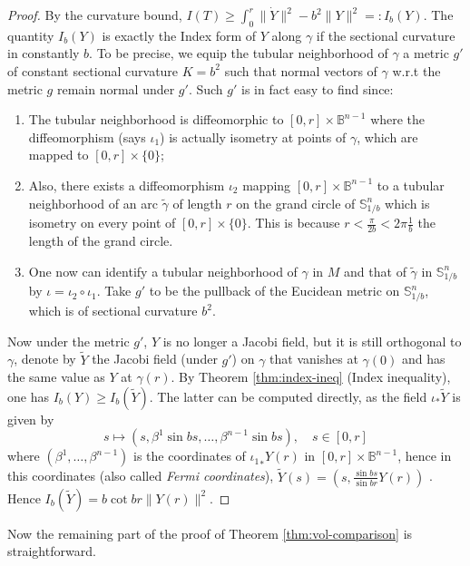 \documentclass[11pt]{article}
\begin{document}
\begin{proof}
By the curvature bound, \(I(T) \geq \int_0^r \| \dot Y\|^2 -b^2 \|Y\|^2=:I_b(Y)\). The
quantity \(I_b(Y)\) is exactly the Index form of \(Y\) along \(\gamma\) if the
sectional curvature in constantly \(b\). To be precise, we equip the tubular
neighborhood of \(\gamma\) a metric \(g'\) of constant sectional curvature \(K=b^2\)
such that normal vectors of \(\gamma\) w.r.t the metric \(g\) remain normal under \(g'\). Such \(g'\) is in fact easy to find since: 
\begin{enumerate}
\item The tubular neighborhood is diffeomorphic to
\([0,r]\times \mathbb{B}^{n-1}\) where the diffeomorphism (says \(\iota_1\)) is actually isometry at points
of \(\gamma\), which are mapped to \([0,r]\times \{0\}\);
\item Also, there exists a diffeomorphism \(\iota_2\) mapping \([0,r]\times\mathbb{B}^{n-1}\) to a tubular neighborhood of an arc \(\tilde\gamma\) of length \(r\) on the grand
circle of \(\mathbb{S}^n_{1/b}\) which is isometry on every point of
\([0,r]\times \{0\}\). This is because \(r < \frac{\pi}{2b} < 2\pi \frac{1}{b}\) the length
of the grand circle.
\item One now can identify a tubular neighborhood of \(\gamma\) in \(M\) and that of \(\tilde \gamma\) in \(\mathbb{S}^n_{1/b}\) by \(\iota = \iota_2\circ\iota_1\). Take
\(g'\) to be the pullback of the Eucidean metric on \(\mathbb{S}^n_{1/b}\), which is of sectional curvature \(b^2\).
\end{enumerate}

Now under the metric \(g'\), \(Y\) is no longer a Jacobi field, but it is still
orthogonal to \(\gamma\), denote by \(\tilde Y\) the Jacobi field (under \(g'\)) on
\(\gamma\) that vanishes at \(\gamma(0)\) and has the same value as \(Y\) at \(\gamma(r)\). By Theorem \ref{thm:index-ineq} (Index inequality), one has \(I_b(Y)
\geq I_b(\tilde Y)\). The latter can be computed directly, as the field \(\iota_*\tilde Y\) is given by
\[
 s\mapsto (s,\beta^1\sin bs, \dots, \beta^{n-1}\sin bs), \quad s\in [0,r]
\]
where \((\beta^1,\dots,\beta^{n-1})\) is the coordinates of \({\iota_1}_* Y(r)\) in
\([0,r]\times \mathbb{B}^{n-1}\), hence in this coordinates (also called \emph{Fermi coordinates}), \(\tilde Y(s) = \left(s,\frac{\sin bs}{\sin br}Y(r)\right)\) . Hence
\(I_b(\tilde Y) = b\cot br \|Y(r) \|^2\).
\end{proof}

Now the remaining part of the proof of Theorem \ref{thm:vol-comparison} is straightforward.
\end{document}
